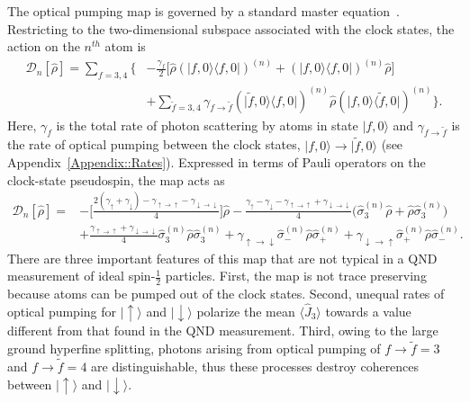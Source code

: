 \documentclass[preprint, aps,pra,onecolumn]{revtex4-1} %
\def\bra#1{\langle{#1}\rvert}%
\def\ket#1{\lvert{#1}\rangle}%
\newcommand{\nn}{\nonumber}
\newcommand{\op}[2]{\ket{#1}\bra{#2}}
\newcommand{\expt}[1]{\langle{#1}\rangle}
\newcommand{\smallfrac}[2]{\mbox{$\frac{#1}{#2}$}}
\newcommand{\half}{\smallfrac{1}{2}}
\newcommand{\jz}{\hat{J}_3}
\newcommand{\gammauu}{\gamma_{\uparrow \rightarrow \uparrow}}
\newcommand{\gammadd}{\gamma_{\downarrow \rightarrow \downarrow}}
\newcommand{\gammaud}{\gamma_{\uparrow \rightarrow \downarrow}}
\newcommand{\gammadu}{\gamma_{\downarrow \rightarrow \uparrow}}
\newcommand{\gammau}{\gamma_{\uparrow}}
\newcommand{\gammad}{\gamma_{\downarrow}}
\begin{document}
The optical pumping map is governed by a standard master equation~\cite{deutsch_quantum_2010}.  
Restricting to the two-dimensional subspace associated with the clock states, the action on the $n^{th}$ atom is
	\begin{align}
		\mathcal{D}_n[\hat{\rho}] =  \sum_{f=3,4} \Big\{& -\frac{\gamma_{f}}{2} \big[ \hat{\rho} (\op{f,0}{f,0})^{(n)} + (\op{f,0}{f,0})^{(n)}\hat{\rho} \big]\\
		&+  \sum_{\tilde{f} =3,4}  \gamma_{f \rightarrow \tilde{f}}(\op{\tilde{f},0}{f,0})^{(n)} \hat{\rho}(\op{f,0}{\tilde{f},0})^{(n)} \Big\}.\nonumber
	\end{align}
Here, $\gamma_{f}$ is the total rate of photon scattering by atoms in state $\ket{f,0}$ and  $\gamma_{f \rightarrow \tilde{f} }$ is the rate of optical pumping between the clock states, $\ket{f,0} \rightarrow \ket{\tilde{f},0}$ (see Appendix~\ref{Appendix::Rates}). Expressed in terms of Pauli operators on the clock-state pseudospin, the map acts as
	\begin{align} \label{Eq::OpticalPumpingMapSchr}
		\mathcal{D}_n [\hat{\rho}] 
				=& - \bigg[ \frac{2(\gammau+ \gammad) - \gammauu - \gammadd}{4} \bigg] \hat{\rho} - \frac{ \gammau - \gammad - \gammauu + \gammadd }{4} \big( \hat{\sigma}_3^{(n)} \hat{\rho}+ \hat{\rho} \hat{\sigma}_3^{(n)} \big) \nn \\
		&+ \frac{\gammauu+\gammadd}{4} \hat{\sigma}_ 3^{(n)}\hat{\rho} \hat{\sigma}_3^{(n)} + \gammaud  \hat{\sigma}_-^{(n)} \hat{\rho} \hat{\sigma}_+^{(n)} + \gammadu  \hat{\sigma}_+^{(n)} \hat{\rho} \hat{\sigma}_- ^{(n)}.   
	\end{align} 
There are three important features of this map that are not typical in a QND measurement of ideal spin-$\half$ particles.  
First, the map is not trace preserving because atoms can be pumped out of the clock states. 
Second, unequal rates of optical pumping for $\ket{\uparrow}$ and $\ket{\downarrow}$ polarize the mean $\expt{\jz}$ towards a value different from that found in the QND measurement. 
Third, owing to the large ground hyperfine splitting, photons arising from optical pumping of $f \rightarrow \tilde{f}=3$ and $f \rightarrow \tilde{f}=4$ are distinguishable, thus these processes destroy coherences between $\ket{\uparrow}$ and $\ket{\downarrow}$. 
\end{document}
